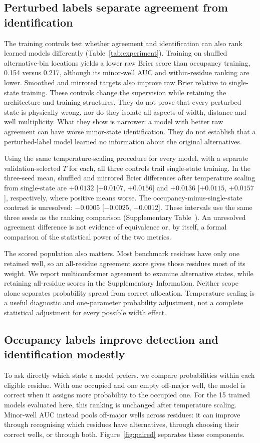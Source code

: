\documentclass[10pt,twocolumn,a4paper]{article}
\begin{document}
\subsection{Perturbed labels separate agreement from identification}
The training controls test whether agreement and identification can also rank learned models differently (Table~\ref{tab:experiment}). Training on shuffled alternative-bin locations yields a lower raw Brier score than occupancy training, 0.154 versus 0.217, although its minor-well AUC and within-residue ranking are lower. Smoothed and mirrored targets also improve raw Brier relative to single-state training. These controls change the supervision while retaining the architecture and training structures. They do not prove that every perturbed state is physically wrong, nor do they isolate all aspects of width, distance and well multiplicity. What they show is narrower: a model with better raw agreement can have worse minor-state identification. They do not establish that a perturbed-label model learned no information about the original alternatives.

Using the same temperature-scaling procedure for every model, with a separate validation-selected $T$ for each, all three controls trail single-state training. In the three-seed mean, shuffled and mirrored Brier differences after temperature scaling from single-state are $+0.0132$ [$+0.0107$, $+0.0156$] and $+0.0136$ [$+0.0115$, $+0.0157$], respectively, where positive means worse. The occupancy-minus-single-state contrast is unresolved: $-0.0005$ [$-0.0025$, $+0.0012$]. These intervals use the same three seeds as the ranking comparison (Supplementary Table~). An unresolved agreement difference is not evidence of equivalence or, by itself, a formal comparison of the statistical power of the two metrics.

The scored population also matters. Most benchmark residues have only one retained well, so an all-residue agreement score gives those residues most of its weight. We report multiconformer agreement to examine alternative states, while retaining all-residue scores in the Supplementary Information. Neither scope alone separates probability spread from correct allocation. Temperature scaling is a useful diagnostic and one-parameter probability adjustment, not a complete statistical adjustment for every possible width effect.

\subsection{Occupancy labels improve detection and identification modestly}
\label{sec:discrimination}
To ask directly which state a model prefers, we compare probabilities within each eligible residue. With one occupied and one empty off-major well, the model is correct when it assigns more probability to the occupied one. For the 15 trained models evaluated here, this ranking is unchanged after temperature scaling. Minor-well AUC instead pools off-major wells across residues: it can improve through recognising which residues have alternatives, through choosing their correct wells, or through both. Figure~\ref{fig:paired} separates these components.
\end{document}
